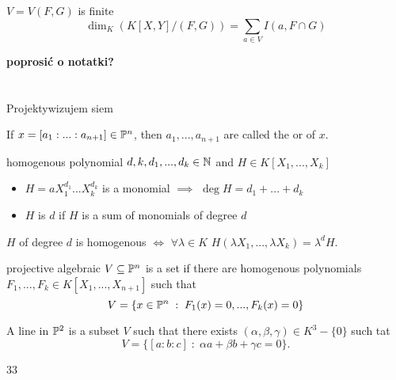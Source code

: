 \documentclass[twoside, a4paper, 12pt]{book}
\begin{document}
\begin{theorem}{}{}
  $V=V(F,G)$ is finite
  $$\dim_K(K[X,Y]/(F,G))=\sum_{a\in V}I(a, F\cap G)$$
\end{theorem}

\textbf{poprosić o notatki?}

\section{}{Projektywizujem siem}

If $x=[a_1:...:a_{n+1}]\in\mathbb{P}^n$, then $a_1,..., a_{n+1}$ are called the  or  of $x$.

\begin{definition}{homogenous polynomial}{}
  $d, k, d_1,..., d_k\in\mathbb{N}$ and $H\in K[X_1,..., X_k]$
  
  \begin{itemize}
    \item $H=aX_1^{d_1}...X_k^{d_k}$ is a monomial $\implies$ $\deg H=d_1+...+d_k$
    \item $H$ is  $d$ if $H$ is a sum of monomials of degree $d$
  \end{itemize}
\end{definition}

$H$ of degree $d$ is homogenous $\iff$ $\forall \lambda\in K$ $H(\lambda X_1,..., \lambda X_k)=\lambda^dH$.

\begin{definition}{projective algebraic}{}
  $V\subseteq \mathbb{P} ^n$ is a  set if there are homogenous polynomials $F_1,..., F_k\in K[X_1,..., X_{n+1}]$ such that 
  $$V=\{x\in\mathbb{P}^n\;:\;F_1(x)=0,..., F_k(x)=0\}$$
\end{definition}

A line in $\mathbb{P}^2$ is a subset $V$ such that there exists $(\alpha,\beta,\gamma)\in K^3-\{0\}$ such tat 
$$V=\{[a:b:c]\;:\;\alpha a+\beta b+\gamma c=0\}.$$

33
\end{document}

